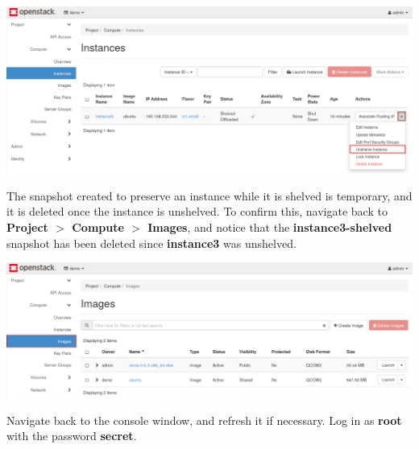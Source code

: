 \documentclass[letterpaper, 12pt]{article}
\begin{document}
\begin{enumerate}
\begin{labstep}
        \begin{center}
            \includegraphics[width=\linewidth]{images/part5/step13.png}
        \end{center}
    \end{labstep}

    \begin{labstep}
        The snapshot created to preserve an instance while it is shelved is temporary, and it is deleted once the instance is unshelved.
        To confirm this, navigate back to \textbf{Project $>$ Compute $>$ Images}, and notice that the \textbf{instance3-shelved} snapshot has been deleted since \textbf{instance3} was unshelved.

        \begin{center}
            \includegraphics[width=\linewidth]{images/part5/step14.png}
        \end{center}
    \end{labstep}

    \begin{labstep}
        Navigate back to the console window, and refresh it if necessary.
        Log in as \textbf{root} with the password \textbf{secret}.


\end{labstep}
\end{enumerate}
\end{document}
